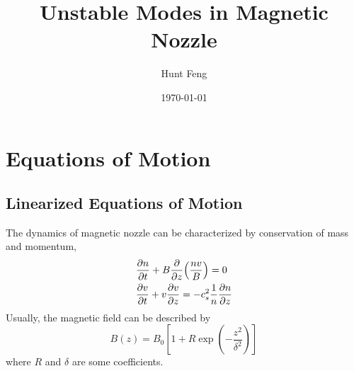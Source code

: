 \documentclass{article}
\title{Unstable Modes in Magnetic Nozzle}
\author{Hunt Feng}
\date{\today}
\theoremstyle{plain}
\theoremstyle{definition}
\theoremstyle{remark}
\theoremstyle{remark}
\begin{document}
\maketitle

\section{Equations of Motion}
\subsection{Linearized Equations of Motion}
The dynamics of magnetic nozzle can be characterized by conservation of mass and momentum,
\begin{align*}
    &\pdv{n}{t} + B\pdv{z}(\frac{nv}{B}) = 0\\
    &\pdv{v}{t} + v\pdv{v}{z} = -c_s^2\frac{1}{n}\pdv{n}{z}
\end{align*}
Usually, the magnetic field can be described by
\[ B(z) = B_0\left[ 1 + R\exp(-\frac{z^2}{\delta^2}) \right] \]
where $R$ and $\delta$ are some coefficients.
\end{document}
